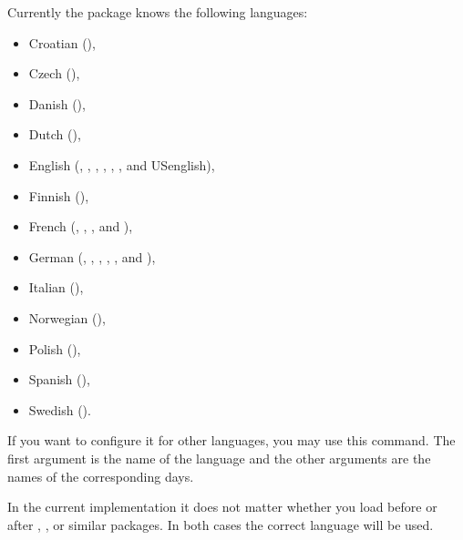 \begin{Declaration}
\end{Declaration}
Currently the package  knows the following languages:
\begin{itemize}\setlength{\itemsep}{.5\itemsep}
\item Croatian (),
\item Czech (),
\item Danish (),
\item Dutch (),
\item English (,
  , , , ,
  , and USenglish),
\item Finnish (),
\item French (, ,
  , and ),
\item German (,
  , , ,
  , and
  ),
\item Italian (),
\item Norwegian (),
\item Polish (),
\item Spanish (),
\item Swedish ().
\end{itemize}
If you want to configure it for other languages, you may use this command. The
first argument is the name of the language and the other arguments are the
names of the corresponding days.

In the current implementation it does not matter whether you load
 before or after
,
,
 or similar packages. In both cases the
correct language will be used.


